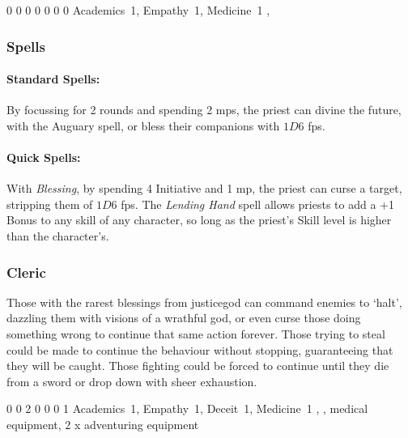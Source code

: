 {\begin{multicols}{2}
{0}%
{0}%
{{0}%
{0}%
{0}}%
{0}%
{0}%
{Academics~1, Empathy~1, Medicine~1
}%
{\quarterstaff, \partialleather}%
{\addtocounter{fp}{5}}


\subsubsection{Spells}

\paragraph{Standard Spells:}

By focussing for 2 rounds and spending 2 \glspl{mp}, the priest can divine the future, with the Auguary spell, or bless their companions with $1D6$ \glspl{fp}.

\paragraph{Quick Spells:}
With \textit{Blessing}, by spending 4 Initiative and 1 \gls{mp}, the priest can curse a target, stripping them of $1D6$ \glspl{fp}.
The \textit{Lending Hand} spell allows priests to add a +1 Bonus to any skill of any character, so long as the priest's Skill level is higher than the character's.

\subsubsection{Cleric}

Those with the rarest blessings from \gls{justicegod} can command enemies to `halt', dazzling them with visions of a wrathful god, or even curse those doing something wrong to continue that same action forever.
Those trying to steal could be made to continue the behaviour without stopping, guaranteeing that they will be caught.
Those fighting could be forced to continue until they die from a sword or drop down with sheer exhaustion.


{0}%
{0}%
{{2}%
{0}%
{0}}%
{0}%
{1}%
{Academics~1, Empathy~1, Deceit~1, Medicine~1
\knacks{\combatcaster}
}%
{\quarterstaff, \partialchain, medical equipment, 2 x adventuring equipment}%
{\addtocounter{fp}{5}}


\end{multicols}}
